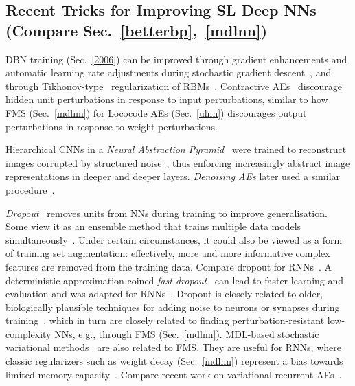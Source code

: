 \documentclass[letterpaper]{article}
\begin{document}
\begin{CJK*}{UTF8}{gbsn}
\begin{sloppypar}
\subsection{Recent Tricks for Improving SL Deep NNs (Compare Sec.~\ref{betterbp},~\ref{mdlnn})}
\label{tricks}

DBN training (Sec.~\ref{2006}) can be improved through gradient enhancements and
automatic  learning rate adjustments during stochastic gradient descent~\citep{cho2013,cho2014}, and through 
Tikhonov-type~\citep{tikhonov1977} regularization of RBMs~\citep{cho2012}.
Contractive AEs~\citep{vincent2011} 
discourage hidden unit perturbations in response to input perturbations, 
similar to how FMS (Sec.~\ref{mdlnn}) for {\sc Lococode} AEs (Sec.~\ref{ulnn}) 
discourages output perturbations in response to weight perturbations.

Hierarchical CNNs in a {\em Neural Abstraction Pyramid}~\citep[e.g.,][]{Behnke:LNCS,Behnke:NCA}
were trained to 
 reconstruct images corrupted by structured noise~\citep{Behnke:IJCIA2001},
thus enforcing increasingly abstract image representations in 
deeper and deeper layers.
{\em Denoising AEs} later used a similar procedure~\citep{vincent:2008}.


{\em Dropout}~\citep{Hinton2012,frey2013}  removes units from NNs during training to improve generalisation. Some view it as an ensemble method that trains multiple data models simultaneously~\citep{baldidropout2014}. 
Under certain circumstances, 
it could also be viewed as a form of training set augmentation: 
effectively, more and more informative complex features are removed from the training data. 
Compare dropout for RNNs~\citep{Pham2013,pachitariu2013regularization,pascanu2013construct}. 
A deterministic approximation coined {\em fast dropout}~\citep{wang2013fast} can lead to faster learning and evaluation and was adapted for RNNs~\citep{bayer2013fast}.
Dropout is closely related to older, biologically plausible techniques 
for adding noise to neurons 
or synapses during training~\citep[e.g.,][]{hanson1990,Murray:93,Schuster:92,Nadal:94,giles95,an96},
which in turn are closely related to finding perturbation-resistant low-complexity NNs,
e.g., through FMS (Sec.~\ref{mdlnn}).
MDL-based stochastic variational methods~\citep{Graves2011} 
are also related to FMS.
They are useful for RNNs, where classic regularizers such as  weight decay
(Sec.~\ref{mdlnn}) represent a 
bias towards limited memory capacity~\citep[e.g.,][]{pascanu2013}. 
Compare recent work on variational recurrent AEs~\citep{bayer2014variational}.


\end{sloppypar}
\end{CJK*}
\end{document}
